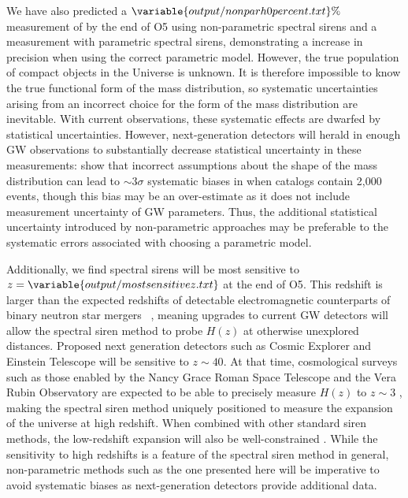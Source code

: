 \documentclass[]{aastex631}
\begin{document}
We have also predicted a $\variable{output/nonparh0percent.txt}\%$ measurement of \Ho{} by the end of \ac{O5} using non-parametric spectral sirens and a  %
measurement with parametric spectral sirens, demonstrating a  increase in precision when using the correct parametric model.
However, the true population of compact objects in the Universe is unknown.
It is therefore impossible to know the true functional form of the mass distribution, so systematic uncertainties arising from an incorrect choice for the form of the mass distribution are inevitable.
With current observations, these systematic effects are dwarfed by statistical uncertainties.
However, next-generation detectors will herald in enough \ac{GW} observations to substantially decrease statistical uncertainty in these measurements: \citet{pierra_study_2023} show that incorrect assumptions about the shape of the mass distribution can lead to $\sim3\sigma$ systematic biases in \Ho{} when catalogs contain 2,000 events, though this bias may be an over-estimate as it does not include measurement uncertainty of \ac{GW} parameters.
Thus, the additional statistical uncertainty introduced by non-parametric approaches may be preferable to the systematic errors associated with choosing a parametric model.

Additionally, we find spectral sirens will be most sensitive to $z=\variable{output/mostsensitivez.txt}$ at the end of \acf{O5}.
This redshift is larger than the expected redshifts of detectable electromagnetic counterparts of binary neutron star mergers ~\citep{kiendrebeogo_updated_2023}, meaning upgrades to current \ac{GW} detectors will allow the spectral siren method to probe $H(z)$ at otherwise unexplored distances.
Proposed next generation detectors such as Cosmic Explorer and Einstein Telescope will be sensitive to $z\sim40$.
At that time, cosmological surveys such as those enabled by the Nancy Grace Roman Space Telescope and the Vera Rubin Observatory are expected to be able to precisely measure $H(z)$ to $z\sim3$ \citep{spergel_wide-field_2015}, making the spectral siren method uniquely positioned to measure the expansion of the universe at high redshift.
When combined with other standard siren methods, the low-redshift expansion will also be well-constrained \citep{Chen:2024gdn}.
While the sensitivity to high redshifts is a feature of the spectral siren method in general, non-parametric methods such as the one presented here will be imperative to avoid systematic biases as next-generation detectors provide additional data. 
\end{document}
